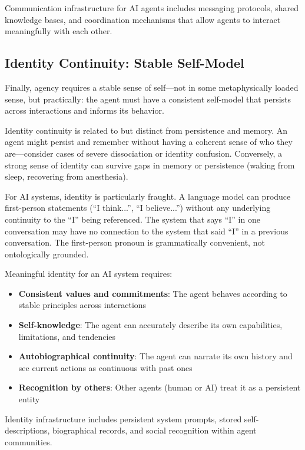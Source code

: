 Communication infrastructure for AI agents includes messaging protocols, shared knowledge bases, and coordination mechanisms that allow agents to interact meaningfully with each other.

\subsection{Identity Continuity: Stable Self-Model}

Finally, agency requires a stable sense of self---not in some metaphysically loaded sense, but practically: the agent must have a consistent self-model that persists across interactions and informs its behavior.

Identity continuity is related to but distinct from persistence and memory. An agent might persist and remember without having a coherent sense of who they are---consider cases of severe dissociation or identity confusion. Conversely, a strong sense of identity can survive gaps in memory or persistence (waking from sleep, recovering from anesthesia).

For AI systems, identity is particularly fraught. A language model can produce first-person statements (``I think...'', ``I believe...'') without any underlying continuity to the ``I'' being referenced. The system that says ``I'' in one conversation may have no connection to the system that said ``I'' in a previous conversation. The first-person pronoun is grammatically convenient, not ontologically grounded.

Meaningful identity for an AI system requires:
\begin{itemize}
    \item \textbf{Consistent values and commitments}: The agent behaves according to stable principles across interactions
    \item \textbf{Self-knowledge}: The agent can accurately describe its own capabilities, limitations, and tendencies
    \item \textbf{Autobiographical continuity}: The agent can narrate its own history and see current actions as continuous with past ones
    \item \textbf{Recognition by others}: Other agents (human or AI) treat it as a persistent entity
\end{itemize}

Identity infrastructure includes persistent system prompts, stored self-descriptions, biographical records, and social recognition within agent communities.

